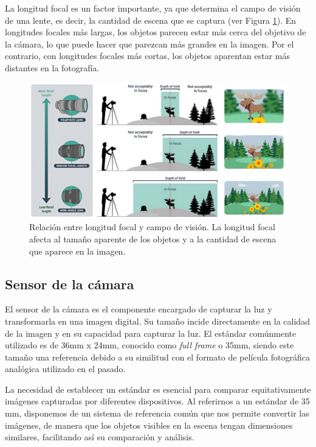 La longitud focal es un factor importante, ya que determina el campo de visión de una lente, es decir, la cantidad de escena que se captura (ver Figura \ref{fig11.2}).  En longitudes focales más largas, los objetos parecen estar más cerca del objetivo de la cámara, lo que puede hacer que parezcan más grandes en la imagen. Por el contrario, con longitudes focales más cortas, los objetos aparentan estar más distantes en la fotografía.

\begin{figure}[h]
	\centering
	\includegraphics[scale=0.55]{imagenes/cap1/perspective.png}
	\caption[Relación entre longitud focal y campo de visión.]{Relación entre longitud focal y campo de visión. La longitud focal afecta al tamaño aparente de los objetos y a la cantidad de escena que aparece en la imagen.}
	\label{fig11.2}
\end{figure}

\subsection*{Sensor de la cámara}
El sensor de la cámara es el componente encargado de capturar la luz y transformarla en una imagen digital. Su tamaño incide directamente en la calidad de la imagen y en su capacidad para capturar la luz. El estándar comúnmente utilizado es de 36mm x 24mm, conocido como \textit{full frame} o 35mm, siendo este tamaño una referencia debido a su similitud con el formato de película fotográfica analógica utilizado en el pasado.

La necesidad de establecer un estándar es esencial para comparar equitativamente imágenes capturadas por diferentes dispositivos. Al referirnos a un estándar de 35 mm, disponemos de un sistema de referencia común que nos permite convertir las imágenes, de manera que los objetos visibles en la escena tengan dimensiones similares, facilitando así su comparación y análisis.

